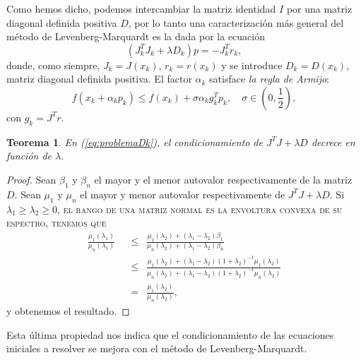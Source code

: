 \documentclass[11pt,a4paper]{book}
\newtheorem{theorem}{Teorema}[chapter]
\theoremstyle{definition}
\theoremstyle{remark}
\begin{document}
Como hemos dicho, podemos intercambiar la matriz identidad $I$ por una matriz diagonal definida positiva $D$, por lo tanto una caracterización más general del método de Levenberg-Marquardt es la dada por la ecuación
\begin{equation}
\label{eq:problemaDk}
(J_k^TJ_k+\lambda D_k)p = -J_k^Tr_k,
\end{equation}
donde, como siempre, $J_k=J(x_k)$, $r_k = r(x_k)$ y se introduce $D_k = D(x_k)$, matriz diagonal definida positiva. El factor $\alpha_k$ satisface \textit{la regla de Armijo}:
\begin{equation}
\label{eq:Armijo}
	f(x_k+\alpha_kp_k) \leq f(x_k) + \sigma \alpha_kg_k^Tp_k,\quad \sigma \in \left( 0,\frac{1}{2} \right),
\end{equation}
con $g_k= J^Tr$.
\begin{theorem}
	En (\ref{eq:problemaDk}), el condicionamiento de $J^TJ+\lambda D$ decrece en función de $\lambda$.
\end{theorem}
\begin{proof}
	Sean $\beta_1$ y $\beta_n$ el mayor y el menor autovalor respectivamente de la matriz $D$. Sean $\mu_1$ y $\mu_n$ el mayor y menor autovalor respectivamente de $J^TJ+\lambda D$. Si $\lambda_1 \geq \lambda_2 \geq 0$, \textsc{el rango de una matriz normal es la envoltura convexa de su espectro, tenemos que}
\begin{equation}
\begin{split}
\frac{\mu_1(\lambda_1)}{\mu_n(\lambda_1)}\enspace
	&\leq\enspace \frac{\mu_1(\lambda_2)+(\lambda_1-\lambda_2)\beta_1} 					{\mu_n(\lambda_2)+(\lambda_1-\lambda_2)\beta_n} \\
	&\leq\enspace \frac{\mu_1(\lambda_2)+
				(\lambda_1-\lambda_2)(1+\lambda_2)^{-1}\mu_1(\lambda_2)} 					{\mu_n(\lambda_2)+
				(\lambda_1-\lambda_2)(1+\lambda_2)^{-1}\mu_n(\lambda_2)} \\
	&=\enspace \frac{\mu_1(\lambda_2)}{\mu_n(\lambda_2)},
\end{split}
\end{equation}
y obtenemos el resultado.
\end{proof}
Esta última propiedad nos indica que el condicionamiento de las ecuaciones iniciales a resolver se mejora con el método de Levenberg-Marquardt.
\end{document}
